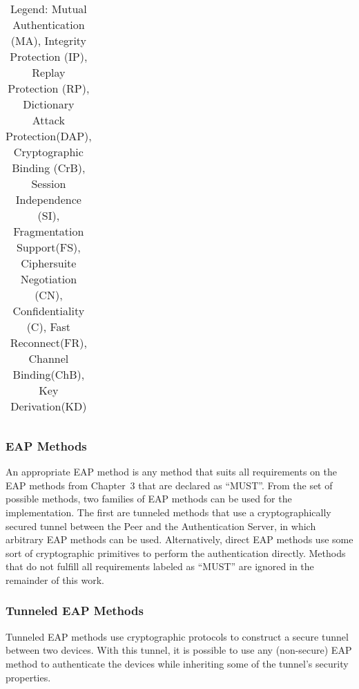 \begin{table}[!ht]
\begin{tabularx}{\textwidth}{r|lcccccccccccc}
  \end{tabularx}
  \caption*{\scriptsize{Legend: Mutual Authentication (MA), Integrity Protection (IP), Replay Protection (RP), Dictionary Attack Protection(DAP), Cryptographic Binding (CrB), Session Independence (SI), Fragmentation Support(FS), Ciphersuite Negotiation (CN), Confidentiality (C), Fast Reconnect(FR), Channel Binding(ChB), Key Derivation(KD)}}

  \label{table:eap_methods}
\end{table}

\subsubsection{EAP Methods}
An appropriate \ac{EAP} method is any method that suits all requirements on the \ac{EAP} methods from Chapter~3 that are declared as ``MUST''. From the set of possible methods, two families of EAP methods can be used for the implementation. The first are tunneled methods that use a cryptographically secured tunnel between the Peer and the Authentication Server, in which arbitrary EAP methods can be used. Alternatively, direct EAP methods use some sort of cryptographic primitives to perform the authentication directly. Methods that do not fulfill all requirements labeled as ``MUST'' are ignored in the remainder of this work.

\subsubsection{Tunneled \ac{EAP} Methods}

Tunneled \ac{EAP} methods use cryptographic protocols to construct a secure tunnel between two devices. With this tunnel, it is possible to use any (non-secure) EAP method to authenticate the devices while inheriting some of the tunnel's security properties.  

